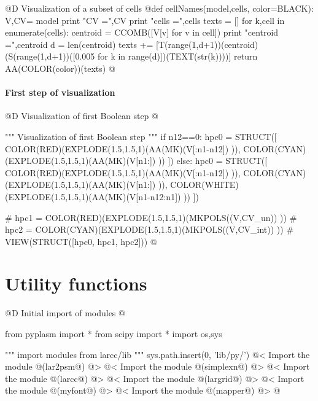 \documentclass[11pt,oneside]{article}	%
\begin{document}
@D Visualization of a subset of cells
@{def cellNames(model,cells, color=BLACK):
	V,CV= model
	print "\n CV =",CV
	print "\n cells =",cells
	texts = []
	for k,cell in enumerate(cells):
		centroid = CCOMB([V[v] for v in cell])
		print "centroid =",centroid
		d = len(centroid)
		texts += [T(range(1,d+1))(centroid)(S(range(1,d+1))([0.005 for k in range(d)])(TEXT(str(k))))]
	return AA(COLOR(color))(texts)
@}


\paragraph{First step of visualization}

@D Visualization of first Boolean step
@{""" Visualization of first Boolean step  """
if n12==0:
	hpc0 = STRUCT([ COLOR(RED)(EXPLODE(1.5,1.5,1)(AA(MK)(V[:n1-n12]) )), 
				COLOR(CYAN)(EXPLODE(1.5,1.5,1)(AA(MK)(V[n1:]) )) ])
else:
	hpc0 = STRUCT([ COLOR(RED)(EXPLODE(1.5,1.5,1)(AA(MK)(V[:n1-n12]) )), 
				COLOR(CYAN)(EXPLODE(1.5,1.5,1)(AA(MK)(V[n1:]) )), 
				COLOR(WHITE)(EXPLODE(1.5,1.5,1)(AA(MK)(V[n1-n12:n1]) )) ])

# hpc1 = COLOR(RED)(EXPLODE(1.5,1.5,1)(MKPOLS((V,CV_un)) ))
# hpc2 = COLOR(CYAN)(EXPLODE(1.5,1.5,1)(MKPOLS((V,CV_int)) ))
# VIEW(STRUCT([hpc0, hpc1, hpc2]))
@}

\appendix
\section{Utility functions}

@D Initial import of modules
@{from pyplasm import *
from scipy import *
import os,sys

""" import modules from larcc/lib """
sys.path.insert(0, 'lib/py/')
@< Import the module @(lar2psm@) @>
@< Import the module @(simplexn@) @>
@< Import the module @(larcc@) @>
@< Import the module @(largrid@) @>
@< Import the module @(myfont@) @>
@< Import the module @(mapper@) @>
@}
\end{document}
